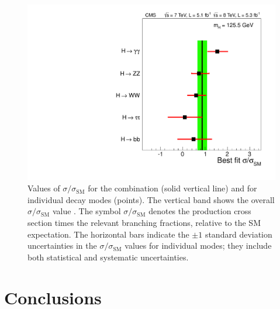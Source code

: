\documentclass[11pt,twoside,a4paper,cmspaper,final]{cms-tdr}
\begin{document}
\begin{figure} [htbp]
\begin{center}
\includegraphics[width=\cmsFigWideWidth]{sqr_mlzs_ccc_mH125_5_decay_v2}
\caption{Values of $\sigma/\sigma_\text{SM}$ for the combination (solid vertical line)
and for individual decay modes (points).
The vertical band shows the overall $\sigma/\sigma_\text{SM}$ value
\MUHAT.
The symbol $\sigma/\sigma_\mathrm{SM}$ denotes the
      production cross section times the relevant branching fractions,
relative to the SM expectation.
The horizontal bars indicate the $\pm 1$ standard deviation uncertainties
in the $\sigma/\sigma_\text{SM}$ values for individual modes; they include both statistical and systematic uncertainties.
    }
\label{fig:SelfConsistencyDecayProd}
\end{center}
\end{figure}


\section{Conclusions}\label{sec:Conclusion}
\end{document}

